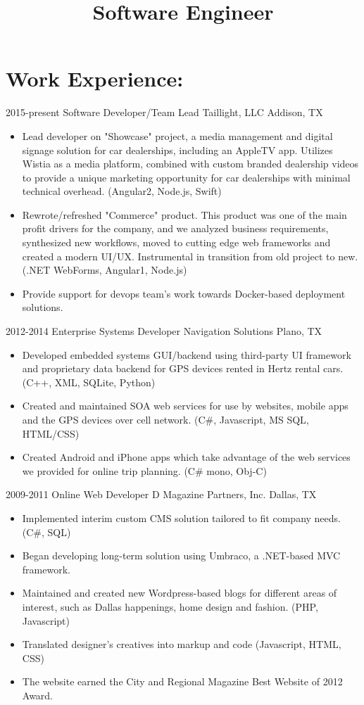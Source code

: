 \documentclass{moderncv}
\title{Software Engineer}
\begin{document}
    	
	\makecvtitle
 
    \section{Work Experience:}
 
 		\cventry
 			{2015-present}
 			{Software Developer/Team Lead}   
 			{Taillight, LLC}
 			{Addison, TX}{}
 			{
 				\begin{itemize}
 					\item {Lead developer on "Showcase" project, a media management and digital signage solution for car dealerships, including an AppleTV app. Utilizes Wistia as a media platform, combined with custom branded dealership videos to provide a unique marketing opportunity for car dealerships with minimal technical overhead.  (Angular2, Node.js, Swift)}
 					\item {Rewrote/refreshed "Commerce" product. This product was one of the main profit drivers for the company, and we analyzed business requirements, synthesized new workflows, moved to cutting edge web frameworks and created a modern UI/UX. Instrumental in transition from old project to new. (.NET WebForms, Angular1, Node.js)}
 					\item {Provide support for devops team's work towards Docker-based deployment solutions.}
 				\end{itemize}
			}
		
		\cventry
			{2012-2014}
			{Enterprise Systems Developer}   
			{Navigation Solutions}
			{Plano, TX}{}
			{
				\begin{itemize}
					\item {Developed embedded systems GUI/backend using third-party UI framework and proprietary data backend for GPS devices rented in Hertz rental cars. (C++, XML, SQLite, Python)}
					\item {Created and maintained SOA web services for use by websites, mobile apps and the GPS devices over cell network. (C\#, Javascript, MS SQL, HTML/CSS)}
					\item {Created Android and iPhone apps which take advantage of the web services we provided for online trip planning. (C\# mono, Obj-C)}
				\end{itemize}
			}
		
		\cventry
			{2009-2011}
			{Online Web Developer}   
			{D Magazine Partners, Inc.}
			{Dallas, TX}{}
			{
				\begin{itemize}
					\item {Implemented interim custom CMS solution tailored to fit company needs. (C\#, SQL)}
					\item {Began developing long-term solution using Umbraco, a .NET-based MVC framework.}
					\item {Maintained and created new Wordpress-based blogs for different areas of interest, such as Dallas happenings, home design and fashion. (PHP, Javascript)}
					\item {Translated designer's creatives into markup and code (Javascript, HTML, CSS)}
					\item {The website earned the City and Regional Magazine Best Website of 2012 Award.}
				\end{itemize}
			}
	
\end{document}
